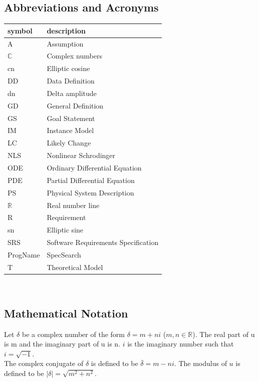 \documentclass[12pt]{article}
\newcommand{\progname}{ProgName} %
\begin{document}
\subsection{Abbreviations and Acronyms}

\renewcommand{\arraystretch}{1.2}
\begin{tabular}{l l} 
  \toprule		
  \textbf{symbol} & \textbf{description}\\
  \midrule 
  A & Assumption\\
  $\mathbb{C}$ & Complex numbers\\
  cn & Elliptic cosine \\
  DD & Data Definition\\
  dn & Delta amplitude \\ 
  GD & General Definition\\
  GS & Goal Statement\\
  IM & Instance Model\\
  LC & Likely Change\\
  NLS & Nonlinear Schrodinger\\
  ODE & Ordinary Differential Equation\\
  PDE & Partial Differential Equation\\
  PS & Physical System Description\\
  $\mathbb{R}$ & Real number line\\
  R & Requirement\\ 
  sn & Elliptic sine\\
  SRS & Software Requirements Specification\\
  \progname{} & SpecSearch\\
  T & Theoretical Model\\  
  \bottomrule
\end{tabular}\\

\subsection{Mathematical Notation}

Let $\delta$ be a complex number of the form $\delta= m + ni$ ($m,n \in 
\mathbb{R}$). The real part of u is m and the imaginary part of u is n. $i$ is 
the imaginary number such that $i=\sqrt{-1}$.\\

The complex 
conjugate of $\delta$ is defined to be $\bar{\delta}= m - ni$. 
The modulus of $u$ is defined to be $|\delta| = \sqrt{m^{2}+n^{2}}$.\\
\end{document}
